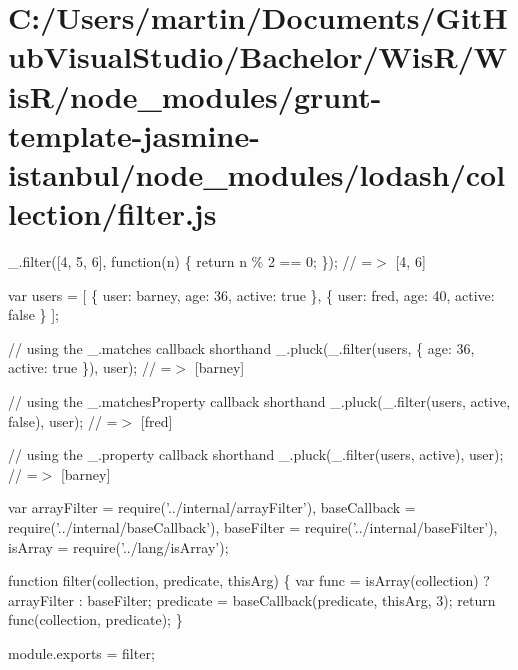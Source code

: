 \hypertarget{_c_1_2_users_2martin_2_documents_2_git_hub_visual_studio_2_bachelor_2_wis_r_2_wis_r_2node_modulec4e75dbfefebe0685e0a78e0d2f45b90}{}\section{C\+:/\+Users/martin/\+Documents/\+Git\+Hub\+Visual\+Studio/\+Bachelor/\+Wis\+R/\+Wis\+R/node\+\_\+modules/grunt-\/template-\/jasmine-\/istanbul/node\+\_\+modules/lodash/collection/filter.\+js}
\+\_\+.\+filter(\mbox{[}4, 5, 6\mbox{]}, function(n) \{ return n \% 2 == 0; \}); // =$>$ \mbox{[}4, 6\mbox{]}

var users = \mbox{[} \{ \textquotesingle{}user\textquotesingle{}\+: \textquotesingle{}barney\textquotesingle{}, \textquotesingle{}age\textquotesingle{}\+: 36, \textquotesingle{}active\textquotesingle{}\+: true \}, \{ \textquotesingle{}user\textquotesingle{}\+: \textquotesingle{}fred\textquotesingle{}, \textquotesingle{}age\textquotesingle{}\+: 40, \textquotesingle{}active\textquotesingle{}\+: false \} \mbox{]};

// using the {\ttfamily \+\_\+.\+matches} callback shorthand \+\_\+.\+pluck(\+\_\+.\+filter(users, \{ \textquotesingle{}age\textquotesingle{}\+: 36, \textquotesingle{}active\textquotesingle{}\+: true \}), \textquotesingle{}user\textquotesingle{}); // =$>$ \mbox{[}\textquotesingle{}barney\textquotesingle{}\mbox{]}

// using the {\ttfamily \+\_\+.\+matches\+Property} callback shorthand \+\_\+.\+pluck(\+\_\+.\+filter(users, \textquotesingle{}active\textquotesingle{}, false), \textquotesingle{}user\textquotesingle{}); // =$>$ \mbox{[}\textquotesingle{}fred\textquotesingle{}\mbox{]}

// using the {\ttfamily \+\_\+.\+property} callback shorthand \+\_\+.\+pluck(\+\_\+.\+filter(users, \textquotesingle{}active\textquotesingle{}), \textquotesingle{}user\textquotesingle{}); // =$>$ \mbox{[}\textquotesingle{}barney\textquotesingle{}\mbox{]}


\begin{DoxyCodeInclude}
var arrayFilter = require(\textcolor{stringliteral}{'../internal/arrayFilter'}),
    baseCallback = require(\textcolor{stringliteral}{'../internal/baseCallback'}),
    baseFilter = require(\textcolor{stringliteral}{'../internal/baseFilter'}),
    isArray = require(\textcolor{stringliteral}{'../lang/isArray'});

\textcolor{keyword}{function} filter(collection, predicate, thisArg) \{
  var func = isArray(collection) ? arrayFilter : baseFilter;
  predicate = baseCallback(predicate, thisArg, 3);
  \textcolor{keywordflow}{return} func(collection, predicate);
\}

module.exports = filter;
\end{DoxyCodeInclude}
 